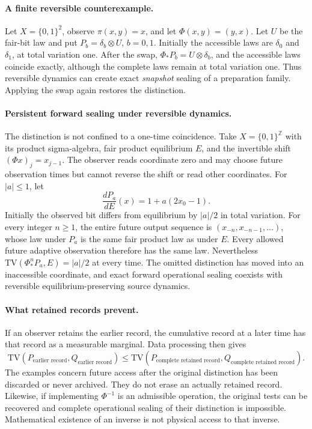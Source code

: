 \documentclass[11pt,a4paper]{article}
\theoremstyle{definition}
\theoremstyle{remark}\newtheorem{remark}[theorem]{Remark}
\newcommand{\TV}{\mathrm{TV}}
\begin{document}
\paragraph{A finite reversible counterexample.}
Let $X=\{0,1\}^2$, observe $\pi(x,y)=x$, and let
$\Phi(x,y)=(y,x)$. Let $U$ be the fair-bit law and put
$P_b=\delta_b\otimes U$, $b=0,1$. Initially the accessible laws are
$\delta_0$ and $\delta_1$, at total variation one. After the swap,
$\Phi_*P_b=U\otimes\delta_b$, and the accessible laws coincide
exactly, although the complete laws remain at total variation one.
Thus reversible dynamics can create exact \emph{snapshot} sealing of
a preparation family. Applying the swap again restores the distinction.

\paragraph{Persistent forward sealing under reversible dynamics.}
The distinction is not confined to a one-time coincidence. Take
$X=\{0,1\}^{\mathbb Z}$ with its product sigma-algebra, fair product
equilibrium $E$, and the invertible shift
$(\Phi x)_j=x_{j-1}$. The observer reads coordinate zero and may choose
future observation times but cannot reverse the shift or read other
coordinates. For $|a|\le1$, let
\[
 \frac{dP_a}{dE}(x)=1+a(2x_0-1).
\]
Initially the observed bit differs from equilibrium by $|a|/2$ in
total variation. For every integer $n\ge1$, the entire future output
sequence is $(x_{-n},x_{-n-1},\ldots)$, whose law under $P_a$ is the
same fair product law as under $E$. Every allowed future adaptive
observation therefore has the same law. Nevertheless
$\TV(\Phi_*^nP_a,E)=|a|/2$ at every time. The omitted distinction has
moved into an inaccessible coordinate, and exact forward operational
sealing coexists with reversible equilibrium-preserving source dynamics.

\paragraph{What retained records prevent.}
If an observer retains the earlier record, the cumulative record at a
later time has that record as a measurable marginal. Data processing
then gives
\[
 \TV(P_{\text{earlier record}},Q_{\text{earlier record}})
 \le \TV(P_{\text{complete retained record}},Q_{\text{complete retained record}}).
\]
The examples concern future access after the original distinction has
been discarded or never archived. They do not erase an actually retained
record. Likewise, if implementing $\Phi^{-1}$ is an admissible operation,
the original tests can be recovered and complete operational sealing of
their distinction is impossible. Mathematical existence of an inverse
is not physical access to that inverse.
\end{document}
